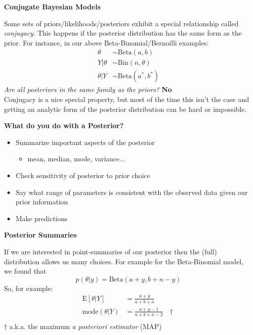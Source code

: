 \documentclass[12pt,xcolor=svgnames]{beamer}
\newcommand{\rd}{\color{red}}
\newcommand{\bl}{\color{blue}}
\newcommand{\theme}{\color{FireBrick}}
\newcommand{\mr}[1]{\mathrm{#1}}
\newcommand{\sk}{\vspace{.4cm}}
\newcommand{\chap}[1]{{\theme \Large \bf #1} \sk}
\begin{document}
\begin{frame}
\chap{Conjugate Bayesian Models}

Some sets of priors/likelihoods/posteriors exhibit a special relationship called {\em \bl conjugacy}. This happens if the posterior distribution has the same form as the prior. For instance, in our above Beta-Binomial/Bernoilli examples:
\begin{align*}
\theta & \sim \mr{Beta} (a,b)\\
Y|\theta &  \sim \mr{Bin} (n, \theta)\\
\theta | Y & \sim \mr{Beta}(a^*, b^*)
\end{align*}
{\em Are all posteriors in the same family as the priors?} {\rd \bf No}\\

Conjugacy is a nice special property, but most of the time this isn't the case and getting an analytic form of the posterior distribution can be hard or impossible.  

\end{frame}

\begin{frame}
\chap{What do you do with a Posterior?}

\begin{itemize}
\item Summarize important aspects of the posterior
	\begin{itemize}
	\item mean, median, mode, variance...
	\end{itemize}
\item Check sensitivity of posterior to prior choice
\item Say what range of parameters is consistent with the observed data given our prior information
\item Make predictions
\end{itemize}

\end{frame}

\begin{frame}
\chap{Posterior Summaries}

If we are interested in point-summaries of our posterior then the (full) distribution allows us many choices. For example for the Beta-Binomial model, we found that
\begin{equation*}
p(\theta | y)=\mr{Beta}(a+y, b+n-y)
\end{equation*}
So, for example:
\begin{align*}
\mr{E}[\theta|Y] & = \frac{a+y}{a+b+n} \\
\mr{mode}(\theta|Y) & = \frac{a+y-1}{a+b+n-2} ~~~ \dagger \\
\end{align*}
\vfill 
\hfill {\bl \footnotesize $\dagger$ a.k.a. the maximum {\em a posteriori estimator} (MAP)}
\end{frame}
\end{document}
